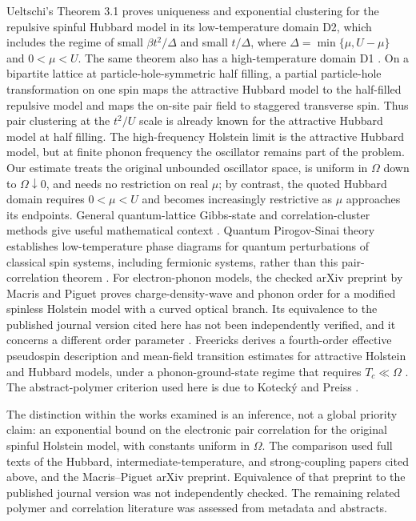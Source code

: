 \documentclass[11pt]{article}
\begin{document}
Ueltschi's Theorem 3.1 proves uniqueness and exponential clustering for the repulsive spinful Hubbard model in its low-temperature domain D2, which includes the regime of small $\beta t^2/\Delta$ and small $t/\Delta$, where $\Delta=\min\{\mu,U-\mu\}$ and $0<\mu<U$. The same theorem also has a high-temperature domain D1 \cite{uelschiHubbard}. On a bipartite lattice at particle-hole-symmetric half filling, a partial particle-hole transformation on one spin maps the attractive Hubbard model to the half-filled repulsive model and maps the on-site pair field to staggered transverse spin. Thus pair clustering at the $t^2/U$ scale is already known for the attractive Hubbard model at half filling. The high-frequency Holstein limit is the attractive Hubbard model, but at finite phonon frequency the oscillator remains part of the problem. Our estimate treats the original unbounded oscillator space, is uniform in $\Omega$ down to $\Omega\downarrow0$, and needs no restriction on real $\mu$; by contrast, the quoted Hubbard domain requires $0<\mu<U$ and becomes increasingly restrictive as $\mu$ approaches its endpoints. General quantum-lattice Gibbs-state and correlation-cluster methods give useful mathematical context \cite{fruhlich,uelschiCorrelations}. Quantum Pirogov-Sinai theory establishes low-temperature phase diagrams for quantum perturbations of classical spin systems, including fermionic systems, rather than this pair-correlation theorem \cite{dff,bku,bkfermion}. For electron-phonon models, the checked arXiv preprint by Macris and Piguet proves charge-density-wave and phonon order for a modified spinless Holstein model with a curved optical branch. Its equivalence to the published journal version cited here has not been independently verified, and it concerns a different order parameter \cite{macris}. Freericks derives a fourth-order effective pseudospin description and mean-field transition estimates for attractive Holstein and Hubbard models, under a phonon-ground-state regime that requires $T_c\ll\Omega$ \cite{freericks}. The abstract-polymer criterion used here is due to Koteck\'y and Preiss \cite{kp}.

The distinction within the works examined is an inference, not a global priority claim: an exponential bound on the electronic pair correlation for the original spinful Holstein model, with constants uniform in $\Omega$. The comparison used full texts of the Hubbard, intermediate-temperature, and strong-coupling papers cited above, and the Macris--Piguet arXiv preprint. Equivalence of that preprint to the published journal version was not independently checked. The remaining related polymer and correlation literature was assessed from metadata and abstracts.
\end{document}
